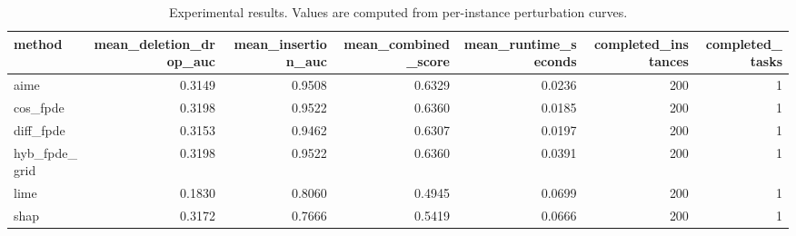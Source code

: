 \begin{table}[t]
\caption{Experimental results. Values are computed from per-instance perturbation curves.}
\label{tab:main_results_computed}
\centering
\begin{tabular}{lrrrrrr}
\toprule
method & mean\_deletion\_drop\_auc & mean\_insertion\_auc & mean\_combined\_score & mean\_runtime\_seconds & completed\_instances & completed\_tasks \\
\midrule
aime & 0.3149 & 0.9508 & 0.6329 & 0.0236 & 200 & 1 \\
cos\_fpde & 0.3198 & 0.9522 & 0.6360 & 0.0185 & 200 & 1 \\
diff\_fpde & 0.3153 & 0.9462 & 0.6307 & 0.0197 & 200 & 1 \\
hyb\_fpde\_grid & 0.3198 & 0.9522 & 0.6360 & 0.0391 & 200 & 1 \\
lime & 0.1830 & 0.8060 & 0.4945 & 0.0699 & 200 & 1 \\
shap & 0.3172 & 0.7666 & 0.5419 & 0.0666 & 200 & 1 \\
\bottomrule
\end{tabular}

\end{table}
